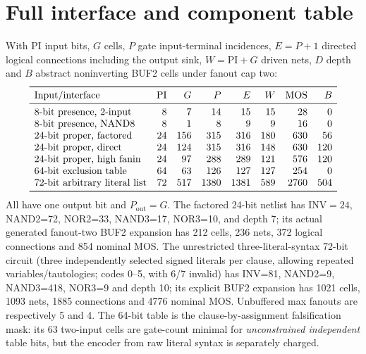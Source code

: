 \documentclass[11pt]{article}
\begin{document}
\section*{Full interface and component table}
With PI input bits, $G$ cells, $P$ gate input-terminal incidences, $E=P+1$ directed logical connections including the output sink, $W=\mathrm{PI}+G$ driven nets, $D$ depth and $B$ abstract noninverting BUF2 cells under fanout cap two:
\[
\begin{array}{lrrrrrrr}
\toprule
\text{Input/interface}& \mathrm{PI}&G&P&E&W&\text{MOS}&B\\
\midrule
\text{8-bit presence, 2-input}&8&7&14&15&15&28&0\\
\text{8-bit presence, NAND8}&8&1&8&9&9&16&0\\
\text{24-bit proper, factored}&24&156&315&316&180&630&56\\
\text{24-bit proper, direct}&24&124&315&316&148&630&120\\
\text{24-bit proper, high fanin}&24&97&288&289&121&576&120\\
\text{64-bit exclusion table}&64&63&126&127&127&254&0\\
\text{72-bit arbitrary literal list}&72&517&1380&1381&589&2760&504\\
\bottomrule
\end{array}
\]
All have one output bit and $P_{\mathrm{out}}=G$. The factored 24-bit netlist has $\mathrm{INV}=24$, NAND2=72, NOR2=33, NAND3=17, NOR3=10, and depth 7; its actual generated fanout-two BUF2 expansion has 212 cells, 236 nets, 372 logical connections and 854 nominal MOS. The unrestricted three-literal-syntax 72-bit circuit (three independently selected signed literals per clause, allowing repeated variables/tautologies; codes 0--5, with 6/7 invalid) has INV=81, NAND2=9, NAND3=418, NOR3=9 and depth 10; its explicit BUF2 expansion has 1021 cells, 1093 nets, 1885 connections and 4776 nominal MOS. Unbuffered max fanouts are respectively 5 and 4. The 64-bit table is the clause-by-assignment falsification mask: its 63 two-input cells are gate-count minimal for \emph{unconstrained independent} table bits, but the encoder from raw literal syntax is separately charged.
\end{document}
